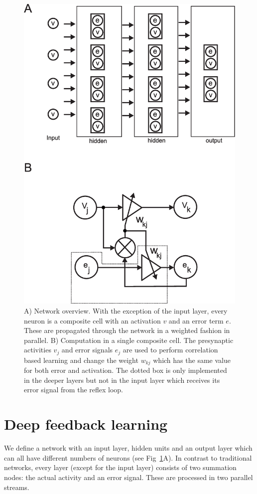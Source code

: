 \documentclass{aamas2018}
\begin{document}
\begin{figure}[!ht]
  \centering
  \includegraphics[width=0.9\columnwidth]{netw_together}
  \caption{A) Network overview. With the exception of the input layer, every
    neuron is a composite cell with an activation $v$ and an error
    term $e$. These are propagated through the network in a weighted
    fashion in parallel.  B) Computation in a single composite cell.
    The presynaptic activities $v_j$ and error signals $e_j$ are used
    to perform correlation based learning and change the weight
    $w_{kj}$ which has the same value for both error and activation.
    The dotted box is only implemented in the deeper layers but not
    in the input layer which receives its error signal from the reflex loop.
    \label{netw_together}}
\end{figure}


\section{Deep feedback learning}
We define a network with an input layer, hidden units and an output
layer which can all have different numbers of neurons (see
Fig~\ref{netw_together}A). In contrast to traditional
networks, every layer (except for the input layer) consists of two
summation nodes: the actual activity and an error signal. These
are processed in two parallel streams.
\end{document}
